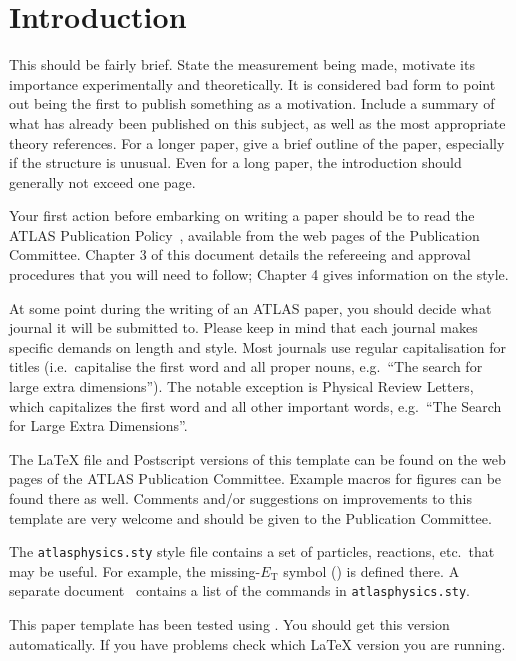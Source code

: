 \documentclass[UKenglish]{latex/atlasdoc}
\begin{document}
\section{Introduction}
\label{sec:intro}

This should be fairly brief. 
State the measurement being made, motivate its importance experimentally and theoretically.
It is considered bad form to point out being the first to publish something as a motivation.
Include a summary of what has already been published on this subject, as well as the most appropriate theory references. For a longer paper, give a brief outline of the paper, especially if the structure is unusual.
Even for a long paper, the introduction should generally not exceed one page.

Your first action before embarking on writing a paper should be to
read the ATLAS Publication Policy~\cite{publication-policy}, available
from the web pages of the Publication Committee. Chapter 3 of this
document details the refereeing and approval procedures that you will
need to follow; Chapter 4 gives information on the style.

At some point during the writing of an ATLAS paper, 
you should decide what journal it will be submitted to.
Please keep in mind that each journal makes specific demands on length and style.
Most journals use regular capitalisation for titles 
(i.e.\ capitalise the first word and all proper nouns, 
e.g.\ ``The search for large extra dimensions''). 
The notable exception is Physical Review Letters, which capitalizes the
first word and all other important words,
e.g.\ ``The Search for Large Extra Dimensions''.

The \LaTeX{} file and Postscript versions of this template can be
found on the web pages of the ATLAS Publication Committee. Example
macros for figures can be found there as well.  Comments and/or
suggestions on improvements to this template are very welcome and
should be given to the Publication Committee.

The \texttt{atlasphysics.sty} style file contains a set of particles,
reactions, etc.\ that may be useful. For example, the missing-$E_{\text{T}}$
symbol (\met{}) is defined there. 
A separate document~\cite{atlas-physics}
contains a list of the commands in \texttt{atlasphysics.sty}.

This paper template has been tested using \LaTeXe.
You should get this version automatically. 
If you have problems check which \LaTeX{} version you are running.
\end{document}
